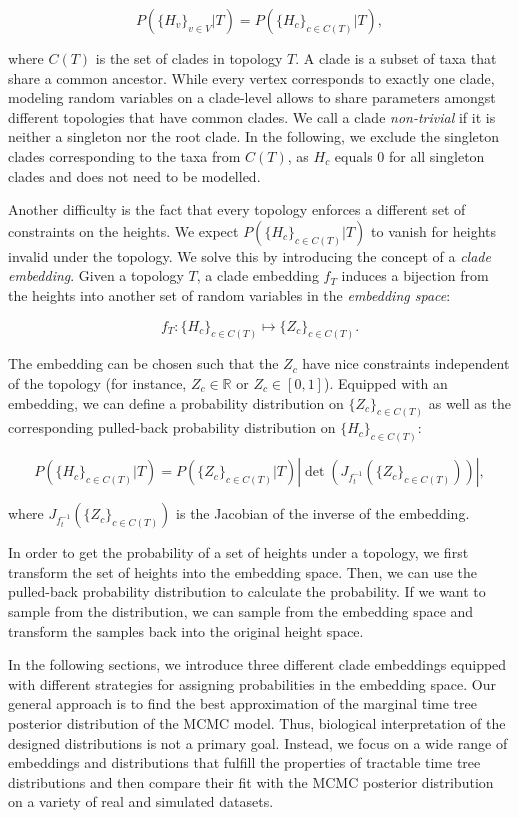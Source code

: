 \documentclass[10pt,letterpaper]{article}
\newcommand{\Pro}[1]{P\left(#1\right)}
\begin{document}
$$
\Pro{\{H_v\}_{v \in V} | T} = \Pro{\{H_c\}_{c \in C(T)} | T},
$$

where $C(T)$ is the set of clades in topology $T$. A clade is a subset of taxa that share a common ancestor. While every vertex corresponds to exactly one clade, modeling random variables on a clade-level allows to share parameters amongst different topologies that have common clades. We call a clade \emph{non-trivial} if it is neither a singleton nor the root clade. In the following, we exclude the singleton clades corresponding to the taxa from $C(T)$, as $H_c$ equals $0$ for all singleton clades and does not need to be modelled. 

Another difficulty is the fact that every topology enforces a different set of constraints on the heights. We expect $P\left(\{H_c\}_{c \in C(T)} | T\right)$ to vanish for heights invalid under the topology. We solve this by introducing the concept of a \emph{clade embedding}. Given a topology $T$, a clade embedding $f_T$ induces a bijection from the heights into another set of random variables in the \emph{embedding space}:

$$
f_T: \{H_c\}_{c \in C(T)} \mapsto \{Z_c\}_{c \in C(T)}.
$$

The embedding can be chosen such that the $Z_c$ have nice constraints independent of the topology (for instance, $Z_c \in \mathbb{R}$ or $Z_c \in [0, 1]$). Equipped with an embedding, we can define a probability distribution on $\{Z_c\}_{c \in C(T)}$ as well as the corresponding pulled-back probability distribution on $\{H_c\}_{c \in C(T)}$:

$$
P\left(\{H_c\}_{c \in C(T)} | T\right) = P\left(\{Z_c\}_{c \in C(T)} | T\right) \left| \det{\left(J_{f_t^{-1}}(\{Z_c\}_{c \in C(T)})\right)} \right|,
$$

where $J_{f_t^{-1}}(\{Z_c\}_{c \in C(T)})$ is the Jacobian of the inverse of the embedding.

In order to get the probability of a set of heights under a topology, we first transform the set of heights into the embedding space. Then, we can use the pulled-back probability distribution to calculate the probability. If we want to sample from the distribution, we can sample from the embedding space and transform the samples back into the original height space.

In the following sections, we introduce three different clade embeddings equipped with different strategies for assigning probabilities in the embedding space. Our general approach is to find the best approximation of the marginal time tree posterior distribution of the MCMC model. Thus, biological interpretation of the designed distributions is not a primary goal. Instead, we focus on a wide range of embeddings and distributions that fulfill the properties of tractable time tree distributions and then compare their fit with the MCMC posterior distribution on a variety of real and simulated datasets.
\end{document}
